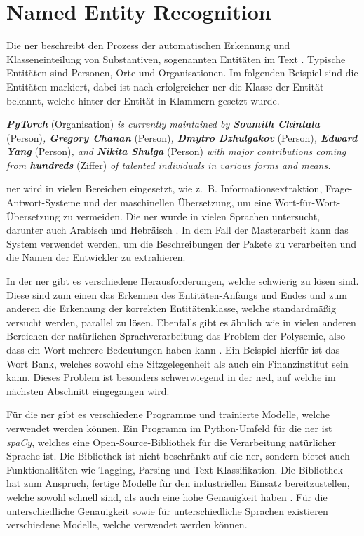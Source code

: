 \section{Named Entity Recognition}
\label{sec:named-entity-recognition}
Die \gls{ner} beschreibt den Prozess der automatischen Erkennung und Klasseneinteilung von Substantiven, sogenannten Entitäten im Text \autocite{mohit_named_2014}.
Typische Entitäten sind Personen, Orte und Organisationen.
Im folgenden Beispiel sind die Entitäten markiert, dabei ist nach erfolgreicher \gls{ner} die Klasse der Entität bekannt, welche hinter der Entität in Klammern gesetzt wurde.

\begin{addmargin}[25pt]{0pt}
    \emph{\textbf{PyTorch}} (Organisation) \emph{is currently maintained by \textbf{Soumith Chintala}} (Person)\emph{, \textbf{Gregory Chanan}} (Person)\emph{, \textbf{Dmytro Dzhulgakov}} (Person)\emph{, \textbf{Edward Yang}} (Person)\emph{, and \textbf{Nikita Shulga}} (Person) \emph{with major contributions coming from \textbf{hundreds}} (Ziffer) \emph{of talented individuals in various forms and means.}
\end{addmargin}

\gls{ner} wird in vielen Bereichen eingesetzt, wie z. B. Informationsextraktion, Frage-Antwort-Systeme und der maschinellen Übersetzung, um eine Wort-für-Wort-Übersetzung zu vermeiden.
Die \gls{ner} wurde in vielen Sprachen untersucht, darunter auch Arabisch und Hebräisch \autocite{mohit_named_2014}.
In dem Fall der Masterarbeit kann das System verwendet werden, um die Beschreibungen der Pakete zu verarbeiten und die Namen der Entwickler zu extrahieren.

In der \gls{ner} gibt es verschiedene Herausforderungen, welche schwierig zu lösen sind.
Diese sind zum einen das Erkennen des Entitäten-Anfangs und Endes und zum anderen die Erkennung der korrekten Entitätenklasse, welche standardmäßig versucht werden, parallel zu lösen.
Ebenfalls gibt es ähnlich wie in vielen anderen Bereichen der natürlichen Sprachverarbeitung das Problem der Polysemie, also dass ein Wort mehrere Bedeutungen haben kann \autocite{mohit_named_2014}.
Ein Beispiel hierfür ist das Wort \glqq Bank\grqq{}, welches sowohl eine Sitzgelegenheit als auch ein Finanzinstitut sein kann.
Dieses Problem ist besonders schwerwiegend in der \gls{ned}, auf welche im nächsten Abschnitt eingegangen wird.

Für die \gls{ner} gibt es verschiedene Programme und trainierte Modelle, welche verwendet werden können.
Ein Programm im Python-Umfeld für die \gls{ner} ist \emph{spaCy}, welches eine Open-Source-Bibliothek für die Verarbeitung natürlicher Sprache ist.
Die Bibliothek ist nicht beschränkt auf die \gls{ner}, sondern bietet auch Funktionalitäten wie Tagging, Parsing und Text Klassifikation.
Die Bibliothek hat zum Anspruch, fertige Modelle für den industriellen Einsatz bereitzustellen, welche sowohl schnell sind, als auch eine hohe Genauigkeit haben \autocite{honnibal_spacy_2024}.
Für die unterschiedliche Genauigkeit sowie für unterschiedliche Sprachen existieren verschiedene Modelle, welche verwendet werden können.
